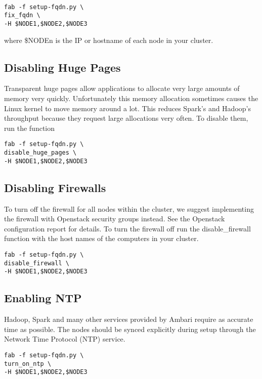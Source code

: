 \documentclass[9pt,twocolumn,twoside]{idsi}
\begin{document}
\begin{verbatim}

fab -f setup-fqdn.py \
fix_fqdn \
-H $NODE1,$NODE2,$NODE3

\end{verbatim}

where \$NODEn is the IP or hostname of each node in your cluster.

\subsection{Disabling Huge Pages}
Transparent huge pages allow applications to allocate very large amounts of memory very quickly. Unfortunately this memory allocation sometimes causes the Linux kernel to move memory around a lot. This reduces Spark's and Hadoop's throughput because they request large allocations very often. To disable them, run the  function

\begin{verbatim}
fab -f setup-fqdn.py \
disable_huge_pages \
-H $NODE1,$NODE2,$NODE3
\end{verbatim}

\subsection{Disabling Firewalls}

To turn off the firewall for all nodes within the cluster, we suggest implementing the firewall with Openstack security groups instead. See the Openstack configuration report for details. To turn the firewall off run the disable\_firewall function with the host names of the computers in your cluster.

\begin{verbatim}
fab -f setup-fqdn.py \
disable_firewall \
-H $NODE1,$NODE2,$NODE3
\end{verbatim}

\subsection{Enabling NTP}
Hadoop, Spark and many other services provided by Ambari require as accurate time as possible.  The nodes should be synced explicitly during setup through the Network Time Protocol (NTP) service. 

\begin{verbatim}
fab -f setup-fqdn.py \
turn_on_ntp \
-H $NODE1,$NODE2,$NODE3
\end{verbatim}
\end{document}
